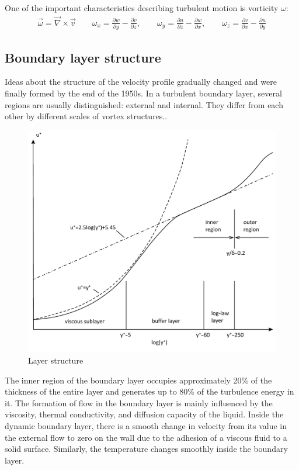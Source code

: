 	One of the important characteristics describing turbulent motion is vorticity $\omega$: 
	\begin{align}
		\vec{\omega} = \vec{\nabla}\times \vec{v} \qquad \omega_x = \frac{\partial w}{\partial y} - \frac{\partial v}{\partial z}, \qquad \omega_y = \frac{\partial u}{\partial z} - \frac{\partial w}{\partial x}, \qquad \omega_z = \frac{\partial v}{\partial x} - \frac{\partial u}{\partial y}
	\end{align}

\subsection{Boundary layer structure}
	Ideas about the structure of the velocity profile gradually changed and were finally formed by the end of the 1950s. In a turbulent boundary layer, several regions are usually distinguished: external and internal. They differ from each other by different scales of vortex structures.\cite{Белов2001}.
	\begin{figure}[H]
		\centering
		\includegraphics[width=0.7\linewidth]{../Assets/ПогранСлойEN}
		\caption{\footnotesize {Layer structure}}
	\end{figure}
	The inner region of the boundary layer occupies approximately 20\% of the thickness of the entire layer and generates up to 80\% of the turbulence energy in it. The formation of flow in the boundary layer is mainly influenced by the viscosity, thermal conductivity, and diffusion capacity of the liquid. Inside the dynamic boundary layer, there is a smooth change in velocity from its value in the external flow to zero on the wall due to the adhesion of a viscous fluid to a solid surface. Similarly, the temperature changes smoothly inside the boundary layer.

